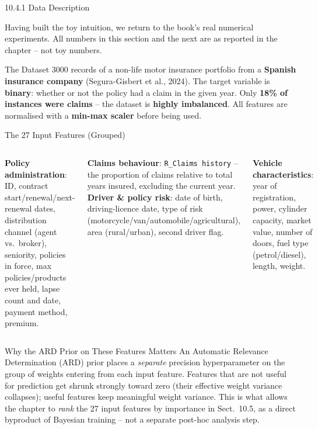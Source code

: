 \documentclass[aspectratio=169,10pt]{beamer}
\begin{document}
\begin{frame}[allowframebreaks]{10.4.1 Data Description}

Having built the toy intuition, we return to the book's real numerical
experiments. All numbers in this section and the next are as reported in the
chapter -- not toy numbers.

  \begin{block}{The Dataset}
    3000 records of a non-life motor insurance portfolio from a
    \textbf{Spanish insurance company} (Segura-Gisbert et al., 2024). The
    target variable is \textbf{binary}: whether or not the policy had a
    claim in the given year. Only \textbf{18\% of instances were claims} --
    the dataset is \textbf{highly imbalanced}. All features are normalised
    with a \textbf{min-max scaler} before being used.
  \end{block}

  \begin{block}{The 27 Input Features (Grouped)}
    \begin{columns}[T]
        \textbf{Policy administration}: ID, contract start/renewal/next-renewal
        dates, distribution channel (agent vs.\ broker), seniority, policies
        in force, max policies/products ever held, lapse count and date,
        payment method, premium.

        \medskip
        \textbf{Claims behaviour}: \texttt{R\_Claims history} -- the
        proportion of claims relative to total years insured, excluding the
        current year.
        \textbf{Driver \& policy risk}: date of birth, driving-licence date,
        type of risk (motorcycle/van/automobile/agricultural), area
        (rural/urban), second driver flag.

        \medskip
        \textbf{Vehicle characteristics}: year of registration, power,
        cylinder capacity, market value, number of doors, fuel type
        (petrol/diesel), length, weight.
    \end{columns}
  \end{block}

  \framebreak

  \begin{block}{Why the ARD Prior on These Features Matters}
    An Automatic Relevance Determination (ARD) prior places a \emph{separate}
    precision hyperparameter on the group of weights entering from each input
    feature. Features that are not useful for prediction get shrunk strongly
    toward zero (their effective weight variance collapses); useful features
    keep meaningful weight variance. This is what allows the chapter to
    \emph{rank} the 27 input features by importance in Sect.\ 10.5, as a
    direct byproduct of Bayesian training -- not a separate post-hoc analysis
    step.
  \end{block}

\end{frame}
\end{document}
